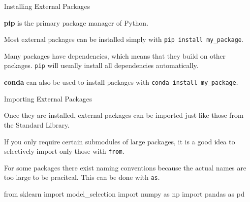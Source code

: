 \begin{frame}[fragile]{Installing External Packages}

    \textbf{pip} is the primary package manager of Python. 

    \vspace{1em}

    Most external packages can be installed simply with \texttt{pip install my\_package}.

    \vspace{1em}

    Many packages have dependencies, which means that they build on other packages. \texttt{pip} will usually install all
    dependencies automatically.

    \vspace{1em}

    \textbf{conda} can also be used to install packages with \texttt{conda install my\_package}.


\end{frame}


\begin{frame}[fragile]{Importing External Packages}

    Once they are installed, external packages can be imported just like those from the Standard Library. 

    \vspace{1em}

    If you only require certain submodules of large packages, it is a good idea to selectively import only those with \texttt{from}.

    \vspace{1em}

    For some packages there exist naming conventions because the actual names are too large to be pracitcal. This can be done with \texttt{as}.

    \vspace{1em}

    \begin{pythoncode}
from sklearn import model_selection
import numpy as np
import pandas as pd
    \end{pythoncode}


\end{frame}


